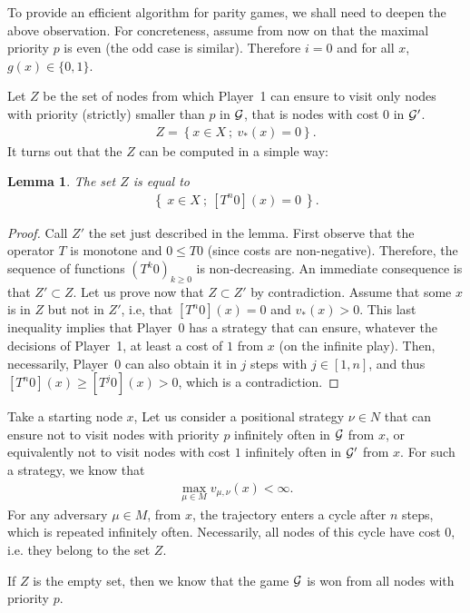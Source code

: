\documentclass{article}
\newtheorem{lemma}{Lemma}
\def\G{{\cal G}}
\def\pa{Player~0}
\def\pb{Player~1}
\begin{document}
To provide an efficient algorithm for parity games, we shall need to deepen the above observation.
For concreteness, assume from now on that the maximal priority $p$ is even (the odd case is similar). Therefore $i=0$ and for all $x$, $g(x) \in \{0,1\}$.

Let $Z$ be the set of nodes from which \pb{ }can ensure to visit only nodes with priority (strictly) smaller than $p$ in $\G$, that is nodes with cost $0$ in $\G'$.
\begin{align}
Z = \left\{ x \in X~;~ v_*(x)=0  \right\}. \label{Z}
\end{align}
It turns out that the $Z$ can be computed in a simple way:
\begin{lemma}
  The set $Z$ is equal to
  \begin{align}
    \left\{~ x \in X ~;~ [T^n 0](x) = 0 ~\right\}.
  \end{align}
\end{lemma}
\begin{proof}
  Call $Z'$ the set just described in the lemma.
  First observe that the operator $T$ is monotone and $0 \le T 0$ (since costs are non-negative). Therefore, the sequence of functions $(T^k 0)_{k \ge 0}$ is non-decreasing. An immediate consequence is that $Z' \subset Z$.
  Let us prove now that $Z \subset Z'$ by contradiction. Assume that some $x$ is in $Z$ but not in $Z'$, i.e, that $[T^n 0](x)=0$ and $v_*(x)>0$. This last inequality implies that \pa{ }has a strategy that can ensure, whatever the decisions of \pb, at least a cost of $1$ from $x$ (on the infinite play). Then, necessarily, \pa{ }can also obtain it in $j$ steps with $j \in [1,n]$, and thus $[T^n 0](x) \ge [T^j 0](x) > 0$, which is a contradiction.
\end{proof}

Take a starting node $x$, Let us consider a positional strategy $\nu \in N$ that can ensure not to visit nodes with priority $p$ infinitely often in $\G$ from $x$, or equivalently not to visit nodes with cost $1$ infinitely often in $\G'$ from $x$. For such a strategy, we know that
\begin{align}
\max_{\mu \in M} v_{\mu,\nu}(x)< \infty.  
\end{align}
For any adversary $\mu \in M$, from $x$, the trajectory enters a cycle after $n$ steps, which is repeated infinitely often. Necessarily, all nodes of this cycle have cost $0$, i.e. they belong to the set $Z$. 

If $Z$ is the empty set, then we know that the game $\G$ is won from all nodes with priority $p$.
\end{document}
